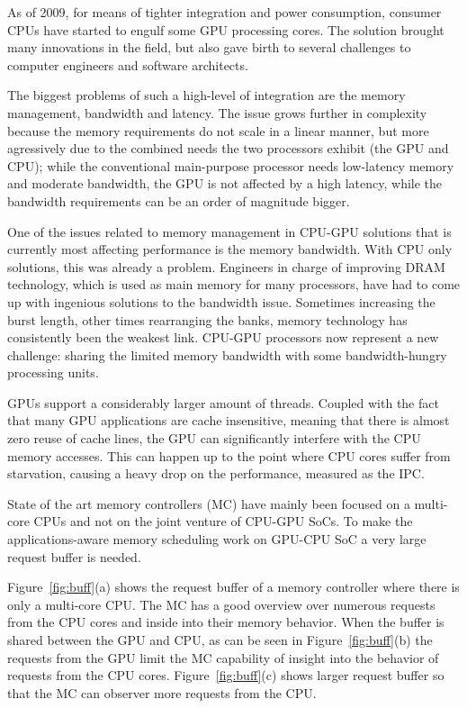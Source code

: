 \documentclass[journal]{IEEEtran}
\begin{document}
As of 2009, for means of tighter integration and power consumption, consumer CPUs have started to engulf some GPU processing cores. The solution brought many innovations in the field, but also gave birth to several challenges to computer engineers and software architects. 

The biggest problems of such a high-level of integration are the memory management, bandwidth and latency. The issue grows further in complexity because the memory requirements do not scale in a linear manner, but more agressively due to the combined needs the two processors exhibit (the GPU and CPU); while the conventional main-purpose processor needs low-latency memory and moderate bandwidth, the GPU is not affected by a high latency, while the bandwidth requirements can be an order of magnitude bigger.

One of the issues related to memory management in CPU-GPU solutions that is currently most affecting performance is the memory bandwidth. With CPU only solutions, this was already a problem. Engineers in charge of improving DRAM technology, which is used as main memory for many processors, have had to come up with ingenious solutions to the bandwidth issue. Sometimes increasing the burst length, other times rearranging the banks, memory technology has consistently been the weakest link. CPU-GPU processors now represent a new challenge: sharing the limited memory bandwidth with some bandwidth-hungry processing units.

GPUs support a considerably larger amount of threads. Coupled with the fact that many GPU applications are cache insensitive, meaning that there is almost zero reuse of cache lines, the GPU can significantly interfere with the CPU memory accesses. This can happen up to the point where CPU cores suffer from starvation, causing a heavy drop on the performance, measured as the IPC.

State of the art memory controllers (MC) have mainly been focused on a multi-core CPUs and not on the joint venture of CPU-GPU SoCs.  To make the applications-aware memory scheduling work on GPU-CPU SoC a very large request buffer is needed.
 
Figure~\ref{fig:buff}(a) shows the request buffer of a memory controller where there is only a multi-core CPU.  The MC has a good overview over numerous requests from the CPU cores and inside into their memory behavior.  When the buffer is shared between the GPU and CPU, as can be seen in Figure~\ref{fig:buff}(b) the requests from the GPU limit the MC capability of insight into the behavior of requests from the CPU cores.  Figure~\ref{fig:buff}(c) shows larger request buffer so that the MC can observer more requests from the CPU\cite{SmS}.
\end{document}
